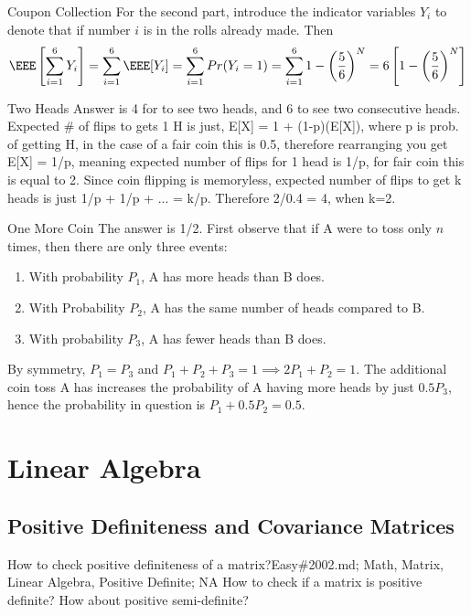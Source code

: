 \documentclass[oldfontcommands]{memoir}
\begin{document}
{\begin{answer}{Coupon Collection}
For the second part, introduce the indicator variables $Y_i$ to denote that if number $i$ is in the rolls already made. Then
\begin{align*}
\EEE\left[\sum_{i=1}^6 Y_i \right] = \sum_{i=1}^6 \EEE[Y_i] = \sum_{i=1}^6 Pr(Y_i = 1) = \sum_{i=1}^6 1 - \left(\frac56\right)^N = 6\left[1 - \left(\frac56\right)^N\right]
\end{align*}\end{answer}
\begin{answer}{Two Heads}
Answer is 4 for to see two heads, and 6 to see two consecutive heads. Expected \# of flips to gets 1 H is just, E[X] = 1 + (1-p)(E[X]), where p is prob. of getting H, in the case of a fair coin this is 0.5, therefore rearranging you get E[X] = 1/p, meaning expected number of flips for 1 head is 1/p, for fair coin this is equal to 2. Since coin flipping is memoryless, expected number of flips to get k heads is just 1/p + 1/p + ... = k/p. Therefore 2/0.4 = 4, when k=2.\end{answer}
\begin{answer}{One More Coin}
The answer is 1/2. First observe that if A were to toss only $n$ times, then there are only three events:
\begin{enumerate}
    \item With probability $P_1$, A has more heads than B does.
    \item With Probability $P_2$, A has the same number of heads compared to B.
    \item With probability $P_3$, A has fewer heads than B does.
\end{enumerate}
By symmetry, $P_1 = P_3$ and $P_1 + P_2 + P_3 = 1 \implies 2P_1 + P_2 = 1$. The additional coin toss A has increases the probability of A having more heads by just $0.5P_3$, hence the probability in question is $P_1 + 0.5P_2 = 0.5$.\end{answer}
\chapter{Linear Algebra}
\minitoc
\section{Positive Definiteness and Covariance Matrices}
\begin{question}{How to check positive definiteness of a matrix?}{Easy}{\#2002.md; Math, Matrix, Linear Algebra, Positive Definite; NA}
How to check if a matrix is positive definite? How about positive semi-definite?


\end{question}}
\end{document}
